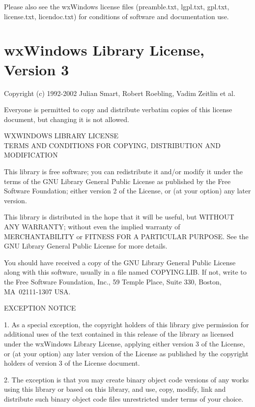Please also see the wxWindows license files (preamble.txt, lgpl.txt, gpl.txt, license.txt,
licendoc.txt) for conditions of software and documentation use.

\section*{wxWindows Library License, Version 3}

Copyright (c) 1992-2002 Julian Smart, Robert Roebling, Vadim Zeitlin et al. 

Everyone is permitted to copy and distribute verbatim copies
of this license document, but changing it is not allowed. 

\begin{center}
WXWINDOWS LIBRARY LICENSE\\
TERMS AND CONDITIONS FOR COPYING, DISTRIBUTION AND MODIFICATION 
\end{center}

This library is free software; you can redistribute it and/or modify it 
under the terms of the GNU Library General Public License as published by 
the Free Software Foundation; either version 2 of the License, or (at 
your option) any later version. 

This library is distributed in the hope that it will be useful, but 
WITHOUT ANY WARRANTY; without even the implied warranty of 
MERCHANTABILITY or FITNESS FOR A PARTICULAR PURPOSE. See the GNU Library 
General Public License for more details. 

You should have received a copy of the GNU Library General Public License 
along with this software, usually in a file named COPYING.LIB. If not, 
write to the Free Software Foundation, Inc., 59 Temple Place, Suite 330,
Boston, MA~02111-1307 USA. 

EXCEPTION NOTICE 

1. As a special exception, the copyright holders of this library give 
permission for additional uses of the text contained in this release of 
the library as licensed under the wxWindows Library License, applying 
either version 3 of the License, or (at your option) any later version of 
the License as published by the copyright holders of version 3 of the 
License document. 

2. The exception is that you may create binary object code versions of any 
works using this library or based on this library, and use, copy, modify, 
link and distribute such binary object code files unrestricted under terms 
of your choice. 

